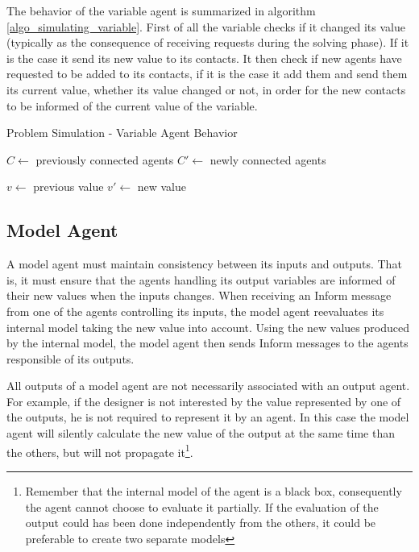 The behavior of the variable agent is summarized in algorithm \ref{algo_simulating_variable}. First of all the variable checks if it changed its value (typically as the consequence of receiving requests during the solving phase). If it is the case it send its new value to its contacts. It then check if new agents have requested to be added to its contacts, if it is the case it add them and send them its current value, whether its value changed or not, in order for the new contacts to be informed of the current value of the variable.

\begin{algorithm}
\caption{Problem Simulation - Variable Agent Behavior}
\label{algo_simulating_variable}

	$C \leftarrow$ previously connected agents\;
	$C'\leftarrow$  newly connected agents\;
		
	$v \leftarrow$ previous value\;
	$v'\leftarrow$ new value\;
	
	
	
\end{algorithm}

\subsection{Model Agent}\label{simulation_model}

A model agent must maintain consistency between its inputs and outputs. That is, it must ensure that the agents handling its output variables are informed of their new values when the inputs changes. When receiving an Inform message from one of the agents controlling its inputs, the model agent reevaluates its internal model taking the new value into account. Using the new values produced by the internal model, the model agent then sends Inform messages to the agents responsible of its outputs.

All outputs of a model agent are not necessarily associated with an output agent. For example, if the designer is not interested by the value represented by one of the outputs, he is not required to represent it by an agent. In this case the model agent will silently calculate the new value of the output at the same time than the others, but will not propagate it\footnote{Remember that the internal model of the agent is a black box, consequently the agent cannot choose to evaluate it partially. If the evaluation of the output could has been done independently from the others, it could be preferable to create two separate models}.

